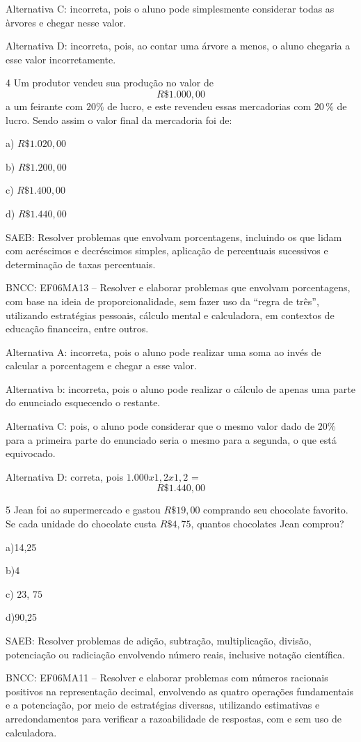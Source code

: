 Alternativa C: incorreta, pois o aluno pode simplesmente considerar
todas as àrvores e chegar nesse valor.

Alternativa D: incorreta, pois, ao contar uma árvore a menos, o aluno
chegaria a esse valor incorretamente.

\num{4}  Um produtor vendeu sua produção no valor de $$R\$1.000,00$$ a um
feirante com $20\%$ de lucro, e este revendeu essas mercadorias com $20\,\%$
de lucro. Sendo assim o valor final da mercadoria foi de:

a) $R\$1.020,00$

b) $R\$1.200,00$

c) $R\$1.400,00$

d) $R\$1.440,00$

SAEB: Resolver problemas que envolvam porcentagens, incluindo os que
lidam com acréscimos e decréscimos simples, aplicação de percentuais
sucessivos e determinação de taxas percentuais.

BNCC: EF06MA13 -- Resolver e elaborar problemas que envolvam
porcentagens, com base na ideia de proporcionalidade, sem fazer uso da
``regra de três'', utilizando estratégias pessoais, cálculo mental e
calculadora, em contextos de educação financeira, entre outros.

Alternativa A: incorreta, pois o aluno pode realizar uma soma ao invés
de calcular a porcentagem e chegar a esse valor.

Alternativa b: incorreta, pois o aluno pode realizar o cálculo de apenas
uma parte do enunciado esquecendo o restante.

Alternativa C: pois, o aluno pode considerar que o mesmo valor dado de
20\% para a primeira parte do enunciado seria o mesmo para a segunda, o
que está equivocado.

Alternativa D: correta, pois $1.000 x 1,2 x 1,2$ = $$R\$1.440,00$$

\num{5}  Jean foi ao supermercado e gastou $R\$19,00$ comprando seu chocolate
favorito. Se cada unidade do chocolate custa $R\$4,75$, quantos
chocolates Jean comprou?

a)14,25

b)4

c) $23$, $75$

d)90,25

SAEB: Resolver problemas de adição, subtração, multiplicação, divisão,
potenciação ou radiciação envolvendo número reais, inclusive notação
científica.

BNCC: EF06MA11 -- Resolver e elaborar problemas com números racionais
positivos na representação decimal, envolvendo as quatro operações
fundamentais e a potenciação, por meio de estratégias diversas,
utilizando estimativas e arredondamentos para verificar a razoabilidade
de respostas, com e sem uso de calculadora.

